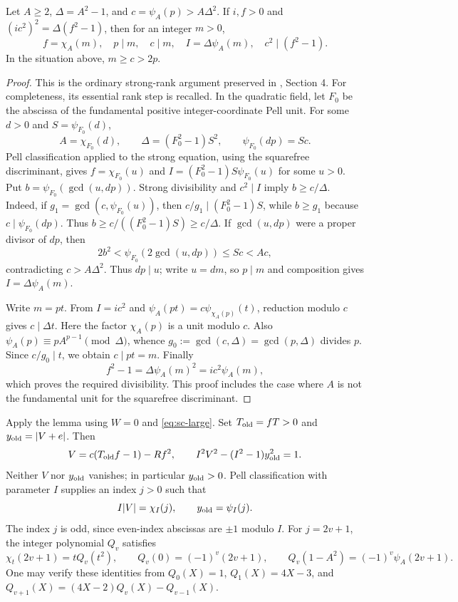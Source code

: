 \begin{lemma}\label{lem:sc-rank}
Let $A\ge2$, $\Delta=A^2-1$, and
$c=\psi_A(p)>A\Delta^2$.  If $i,f>0$ and
$(ic^2)^2=\Delta(f^2-1)$, then for an integer $m>0$,
\[
 f=\chi_A(m),\quad p\mid m,\quad c\mid m,\quad
 I=\Delta\psi_A(m),\quad c^2\mid(f^2-1).
\]
In the situation above, $m\ge c>2p$.
\end{lemma}
\begin{proof}
This is the ordinary strong-rank argument preserved in
, Section 4.  For completeness, its
essential rank step is recalled.  In the quadratic field, let $F_0$ be
the abscissa of the fundamental positive integer-coordinate Pell unit.
For some $d>0$ and $S=\psi_{F_0}(d)$,
\[
 A=\chi_{F_0}(d),\qquad
 \Delta=(F_0^2-1)S^2,\qquad
 \psi_{F_0}(dp)=Sc.
\]
Pell classification applied to the strong equation, using the squarefree
discriminant, gives $f=\chi_{F_0}(u)$ and
$I=(F_0^2-1)S\psi_{F_0}(u)$ for some $u>0$.
Put $b=\psi_{F_0}(\gcd(u,dp))$.
Strong divisibility and $c^2\mid I$ imply $b\ge c/\Delta$.
Indeed, if $g_1=\gcd(c,\psi_{F_0}(u))$, then
$c/g_1\mid(F_0^2-1)S$, while $b\ge g_1$ because
$c\mid\psi_{F_0}(dp)$.  Thus
$b\ge c/((F_0^2-1)S)\ge c/\Delta$.
If $\gcd(u,dp)$ were a proper divisor of $dp$, then
\[
 2b^2<\psi_{F_0}(2\gcd(u,dp))\le Sc<Ac,
\]
contradicting $c>A\Delta^2$.  Thus $dp\mid u$; write $u=dm$,
so $p\mid m$ and composition gives $I=\Delta\psi_A(m)$.

Write $m=pt$.  From $I=ic^2$ and
$\psi_A(pt)=c\psi_{\chi_A(p)}(t)$, reduction modulo $c$ gives
$c\mid\Delta t$.  Here the factor $\chi_A(p)$ is a unit modulo $c$.
Also
$\psi_A(p)\equiv pA^{p-1}\pmod\Delta$, whence
$g_0:=\gcd(c,\Delta)=\gcd(p,\Delta)$ divides $p$.
Since $c/g_0\mid t$, we obtain $c\mid pt=m$.
Finally
\[
 f^2-1=\Delta\psi_A(m)^2=ic^2\psi_A(m),
\]
which proves the required divisibility.  This proof includes the case
where $A$ is not the fundamental unit for the squarefree discriminant.
\end{proof}

Apply the lemma using $W=0$ and \eqref{eq:sc-large}.  Set
$T_{\rm old}=fT>0$ and $y_{\rm old}=|V+e|$.  Then
\begin{equation}\label{eq:sc-aux}
 V=c(T_{\rm old}f-1)-Rf^2,\qquad
 I^2V^2-(I^2-1)y_{\rm old}^2=1.
\end{equation}
Neither $V$ nor $y_{\rm old}$ vanishes; in particular $y_{\rm old}>0$.
Pell classification with parameter $I$ supplies an index $j>0$ such that
\[
 I|V|=\chi_I(j),\qquad y_{\rm old}=\psi_I(j).
\]
The index $j$ is odd, since even-index abscissas are $\pm1$ modulo $I$.
For $j=2v+1$, the integer polynomial $Q_v$ satisfies
\begin{equation}\label{eq:sc-Q}
 \chi_t(2v+1)=tQ_v(t^2),\qquad
 Q_v(0)=(-1)^v(2v+1),\qquad
 Q_v(1-A^2)=(-1)^v\psi_A(2v+1).
\end{equation}
One may verify these identities from
$Q_0(X)=1$, $Q_1(X)=4X-3$, and
$Q_{v+1}(X)=(4X-2)Q_v(X)-Q_{v-1}(X)$.


